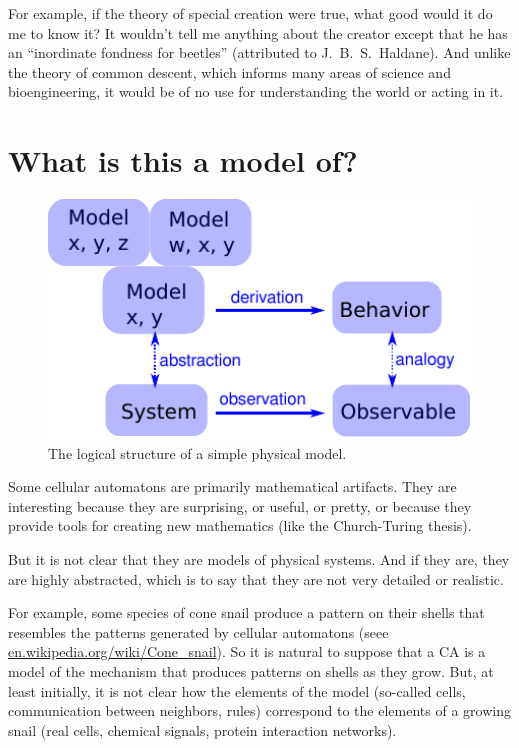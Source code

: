 \documentclass[12pt]{book}
\theoremstyle{exercise}
\begin{document}

For example, if the theory of special creation were true, what good
would it do me to know it?  It wouldn't tell me anything about the
creator except that he has an ``inordinate fondness for beetles''
(attributed to J.~B.~S.~Haldane).  And unlike the
theory of common descent, which informs many areas of science
and bioengineering, it would be of no use for understanding
the world or acting in it.



\section{What is this a model of?}
\label{model3}

\begin{figure}
\centerline{\includegraphics[height=2.5in]{figs/model3.pdf}}
\caption{The logical structure of a simple physical model.}
\label{fig.model3}
\end{figure}

Some cellular automatons are primarily mathematical artifacts.  They are
interesting because they are surprising, or useful, or pretty, or
because they provide tools for creating new mathematics (like the
Church-Turing thesis).


But it is not clear that they are models of physical systems.  And if
they are, they are highly abstracted, which is to say that they are
not very detailed or realistic.


For example, some species of cone snail produce a pattern on their
shells that resembles the patterns generated by cellular automatons
(seee \url{en.wikipedia.org/wiki/Cone_snail}).  So it is natural to
suppose that a CA is a model of the mechanism that produces patterns
on shells as they grow.  But, at least initially, it is not clear how
the elements of the model (so-called cells, communication between
neighbors, rules) correspond to the elements of a growing snail (real
cells, chemical signals, protein interaction networks).
\end{document}
